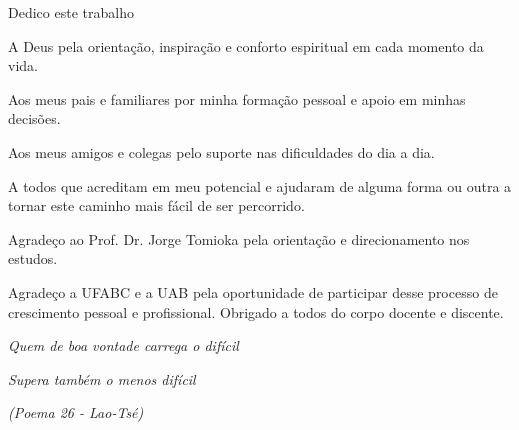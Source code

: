 \documentclass[
    12pt,               %
    openright,          %
    oneside,            %
    a4paper,            %
    chapter=TITLE,      %
    sumario=tradicional,
    english,            %
    french,             %
    spanish,            %
    brazil              %
]{abntex2}
\renewcommand{\imprimircapa}{
    \begin{capa}
        
    \end{capa}
}
\begin{document}
\frenchspacing %

\pretextual
\imprimircapa
\imprimirfolhaderosto



\begin{dedicatoria}
    \vspace*{1 cm}
    Dedico este trabalho
    \newline

    A Deus pela orientação, inspiração e conforto espiritual em cada momento da
    vida.
    \newline

    Aos meus pais e familiares por minha formação pessoal e apoio em minhas
    decisões.
    \newline
    
    Aos meus amigos e colegas pelo suporte nas dificuldades do dia a dia.
    \newline
    
    A todos que acreditam em meu potencial e ajudaram de alguma forma ou outra
    a tornar este caminho mais fácil de ser percorrido.

    \vspace*{\fill}
\end{dedicatoria}

\begin{agradecimentos}
	\vspace*{1 cm}
    Agradeço ao Prof. Dr. Jorge Tomioka pela orientação e direcionamento nos
    estudos.
    \newline
    
    Agradeço a UFABC e a UAB pela oportunidade de participar desse processo de
    crescimento pessoal e profissional.
    Obrigado a todos do corpo docente e discente.
    \vspace*{\fill}
\end{agradecimentos}

\begin{epigrafe}
    \vspace*{\fill}
    \begin{flushright}
        \textit{Quem de boa vontade carrega o difícil}
        
        \textit{Supera também o menos difícil}
        
        \textit{(Poema 26 - Lao-Tsé)}
    \end{flushright}
\end{epigrafe}
\end{document}
